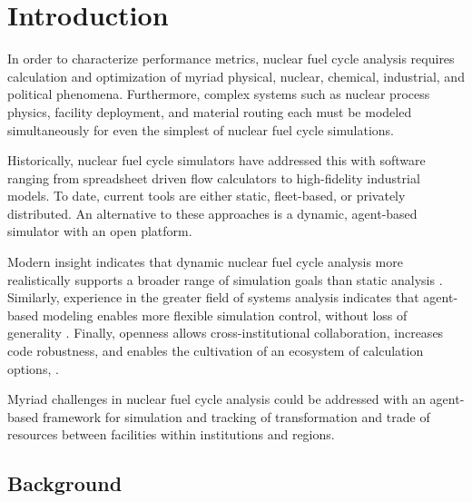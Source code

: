 
\section{Introduction}


In order to characterize performance metrics, nuclear fuel cycle analysis 
requires calculation and optimization of myriad physical, nuclear, chemical, 
industrial, and political phenomena. Furthermore, complex systems such as 
nuclear process physics, facility deployment, and material routing each 
must be modeled simultaneously for even the simplest of nuclear fuel cycle 
simulations. 


Historically, nuclear fuel cycle simulators have addressed this with software 
ranging from spreadsheet driven flow calculators to high-fidelity industrial 
models. To date, current tools are either static, fleet-based, or 
privately distributed. An alternative to these approaches is a dynamic, 
agent-based simulator with an open platform. 

Modern insight indicates that dynamic nuclear fuel cycle analysis more 
realistically supports a broader range of simulation goals than static analysis 
\cite{piet_dynamic_2011}. Similarly, experience in the greater field of systems 
analysis indicates that agent-based modeling enables more flexible simulation 
control, without loss of generality \cite{thatpapermattsent}. Finally, 
openness allows cross-institutional collaboration, increases code robustness, 
and enables the cultivation of an ecosystem of calculation options, 
\cite{softwarecarpentryresource}.  

Myriad challenges in nuclear fuel cycle analysis could be 
addressed with an agent-based framework for simulation and tracking of 
transformation and trade of resources between facilities within institutions 
and regions.  

\subsection{Background}

